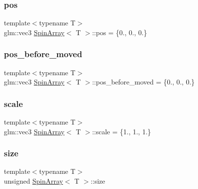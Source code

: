 \subsubsection{\texorpdfstring{pos}{pos}}
{\footnotesize\ttfamily template$<$typename T$>$ \\
glm\+::vec3 \mbox{\hyperlink{classSpinArray}{Spin\+Array}}$<$ T $>$\+::pos = \{0., 0., 0.\}\hspace{0.3cm}{\ttfamily [private]}}

\mbox{\label{classSpinArray_a11a3a9cc8a740ad2af4b2403a23519ac}} 
\subsubsection{\texorpdfstring{pos\+\_\+before\+\_\+moved}{pos\_before\_moved}}
{\footnotesize\ttfamily template$<$typename T$>$ \\
glm\+::vec3 \mbox{\hyperlink{classSpinArray}{Spin\+Array}}$<$ T $>$\+::pos\+\_\+before\+\_\+moved = \{0., 0., 0.\}\hspace{0.3cm}{\ttfamily [private]}}

\mbox{\label{classSpinArray_a9017aa16c2bf03e46c50f94c08ad9346}} 
\subsubsection{\texorpdfstring{scale}{scale}}
{\footnotesize\ttfamily template$<$typename T$>$ \\
glm\+::vec3 \mbox{\hyperlink{classSpinArray}{Spin\+Array}}$<$ T $>$\+::scale = \{1., 1., 1.\}\hspace{0.3cm}{\ttfamily [private]}}

\mbox{\label{classSpinArray_abc99162bc4fea88c6437f7434710b536}} 
\subsubsection{\texorpdfstring{size}{size}}
{\footnotesize\ttfamily template$<$typename T$>$ \\
unsigned \mbox{\hyperlink{classSpinArray}{Spin\+Array}}$<$ T $>$\+::size\hspace{0.3cm}{\ttfamily [private]}}

